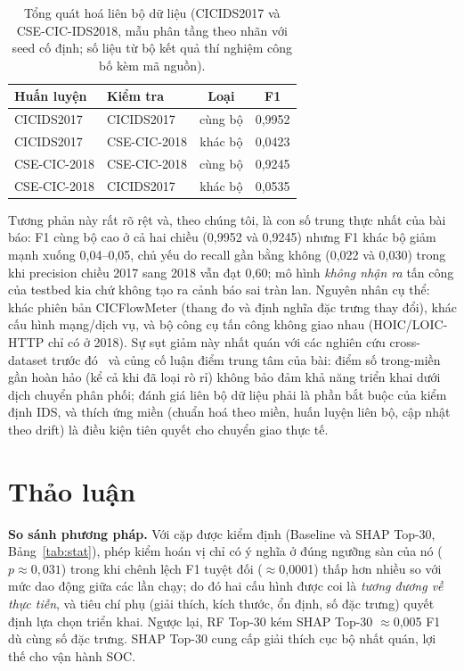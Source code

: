 \documentclass[conference]{IEEEtran}
\begin{document}
\begin{table}[htbp]
  \caption{Tổng quát hoá liên bộ dữ liệu (CICIDS2017 và CSE-CIC-IDS2018, mẫu phân tầng theo nhãn với seed cố định; số liệu từ bộ kết quả thí nghiệm công bố kèm mã nguồn).}
  \label{tab:cross-dataset}
  \centering
  \small
  \begin{tabular}{llcc}
    \toprule
    Huấn luyện & Kiểm tra & Loại & F1 \\
    \midrule
    CICIDS2017 & CICIDS2017 & cùng bộ & 0,9952 \\
    CICIDS2017 & CSE-CIC-2018 & khác bộ & 0,0423 \\
    CSE-CIC-2018 & CSE-CIC-2018 & cùng bộ & 0,9245 \\
    CSE-CIC-2018 & CICIDS2017 & khác bộ & 0,0535 \\
    \bottomrule
  \end{tabular}
\end{table}

Tương phản này rất rõ rệt và, theo chúng tôi, là con số trung thực nhất của bài báo: F1 cùng bộ cao ở cả hai chiều (0,9952 và 0,9245) nhưng F1 khác bộ giảm mạnh xuống 0,04--0,05, chủ yếu do recall gần bằng không (0,022 và 0,030) trong khi precision chiều 2017 sang 2018 vẫn đạt 0,60; mô hình \emph{không nhận ra} tấn công của testbed kia chứ không tạo ra cảnh báo sai tràn lan. Nguyên nhân cụ thể: khác phiên bản CICFlowMeter (thang đo và định nghĩa đặc trưng thay đổi), khác cấu hình mạng/dịch vụ, và bộ công cụ tấn công không giao nhau (HOIC/LOIC-HTTP chỉ có ở 2018). Sự sụt giảm này nhất quán với các nghiên cứu cross-dataset trước đó~\cite{dhooge2020interdataset,cantone2024crossdataset} và củng cố luận điểm trung tâm của bài: điểm số trong-miền gần hoàn hảo (kể cả khi đã loại rò rỉ) không bảo đảm khả năng triển khai dưới dịch chuyển phân phối; đánh giá liên bộ dữ liệu phải là phần bắt buộc của kiểm định IDS, và thích ứng miền (chuẩn hoá theo miền, huấn luyện liên bộ, cập nhật theo drift) là điều kiện tiên quyết cho chuyển giao thực tế.

\section{Thảo luận}
\label{sec:discuss}

\textbf{So sánh phương pháp.} Với cặp được kiểm định (Baseline và SHAP Top-30, Bảng~\ref{tab:stat}), phép kiểm hoán vị chỉ có ý nghĩa ở đúng ngưỡng sàn của nó ($p\approx0{,}031$) trong khi chênh lệch F1 tuyệt đối ($\approx$0{,}0001) thấp hơn nhiều so với mức dao động giữa các lần chạy; do đó hai cấu hình được coi là \emph{tương đương về thực tiễn}, và tiêu chí phụ (giải thích, kích thước, ổn định, số đặc trưng) quyết định lựa chọn triển khai. Ngược lại, RF Top-30 kém SHAP Top-30 $\approx$0{,}005 F1 dù cùng số đặc trưng. SHAP Top-30 cung cấp giải thích cục bộ nhất quán, lợi thế cho vận hành SOC.
\end{document}
